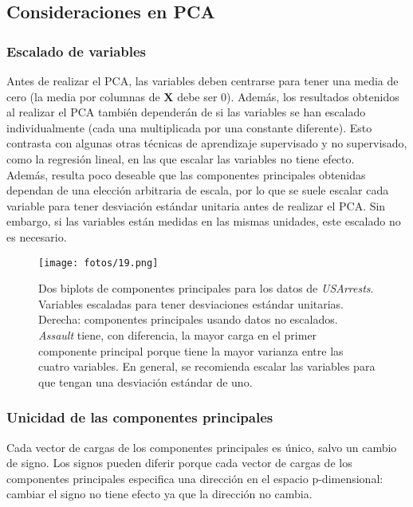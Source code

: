 \subsection{Consideraciones en PCA}

\subsubsection{Escalado de variables}

Antes de realizar el PCA, las variables deben centrarse para tener una media de cero (la media por columnas de $\mathbf{X}$ debe ser 0). Además, los resultados obtenidos al realizar el PCA también dependerán de si las variables se han escalado individualmente (cada una multiplicada por una constante diferente). Esto contrasta con algunas otras técnicas de aprendizaje supervisado y no supervisado, como la regresión lineal, en las que escalar las variables no tiene efecto. \\

Además, resulta poco deseable que las componentes principales obtenidas dependan de una elección arbitraria de escala, por lo que se suele escalar cada variable para tener desviación estándar unitaria antes de realizar el PCA. Sin embargo, si las variables están medidas en las mismas unidades, este escalado no es necesario.

\begin{figure}[h]
\centering
\texttt{[image: fotos/19.png]}
\caption{Dos biplots de componentes principales para los datos de \textit{USArrests}. Variables escaladas para tener desviaciones estándar unitarias. Derecha: componentes principales usando datos no escalados. \textit{Assault} tiene, con diferencia, la mayor carga en el primer componente principal porque tiene la mayor varianza entre las cuatro variables. En general, se recomienda escalar las variables para que tengan una desviación estándar de uno.}
\label{fig:10.3}
\end{figure}

\subsubsection{Unicidad de las componentes principales}

Cada vector de cargas de los componentes principales es único, salvo un cambio de signo. Los signos pueden diferir porque cada vector de cargas de los componentes principales especifica una dirección en el espacio p-dimensional: cambiar el signo no tiene efecto ya que la dirección no cambia.